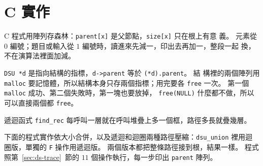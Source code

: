 \section{C 實作}
\label{sec:ds-c}

C 程式用陣列存森林：\texttt{parent[x]} 是父節點，\texttt{size[x]} 只在根上有意
義。 元素從 $0$ 編號；題目或輸入從 $1$ 編號時，讀進來先減一，印出去再加一，整段一起
換，不在演算法裡面加減。

\begin{cbookrecap}[第~14~章 14.5 節、第~15~章 15.4 節、第~19~章 19.3 節]
\texttt{DSU *d} 是指向結構的指標，\texttt{d->parent} 等於 \texttt{(*d).parent}。 結
構裡的兩個陣列用 \texttt{malloc} 要記憶體，所以結構本身只存兩個指標；用完要各
\texttt{free} 一次。 第一個 \texttt{malloc} 成功、第二個失敗時，第一塊也要放掉，
\texttt{free(NULL)} 什麼都不做，所以可以直接兩個都 \texttt{free}。

遞迴函式 \texttt{find\_rec} 每呼叫一層就在呼叫堆疊上多一個框，路徑多長就疊幾層。
\end{cbookrecap}

下面的程式實作依大小合併，以及遞迴和迴圈兩種路徑壓縮：\texttt{dsu\_union} 裡用迴
圈版，單獨的 \texttt{F} 操作用遞迴版。 兩個版本都把整條路徑接到根，結果一樣。 程式
照第~\ref{sec:ds-trace}~節的 $11$ 個操作執行，每一步印出 \texttt{parent} 陣列。

